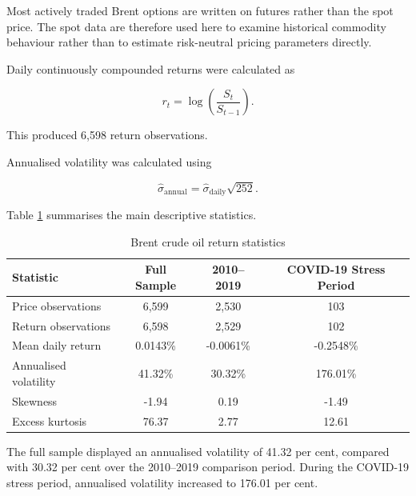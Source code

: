 Most actively traded Brent options are written on futures rather than the spot price. The spot data are therefore used here to examine historical commodity behaviour rather than to estimate risk-neutral pricing parameters directly.

Daily continuously compounded returns were calculated as

\begin{equation}
r_t
=
\log
\left(
\frac{S_t}{S_{t-1}}
\right).
\end{equation}

This produced 6,598 return observations.

Annualised volatility was calculated using

\begin{equation}
\widehat{\sigma}_{\mathrm{annual}}
=
\widehat{\sigma}_{\mathrm{daily}}
\sqrt{252}.
\end{equation}

Table \ref{tab:brent_stats} summarises the main descriptive statistics.

\begin{table}[htbp]
\centering
\caption{Brent crude oil return statistics}
\label{tab:brent_stats}
\begin{tabular}{lccc}
\toprule
Statistic
& Full Sample
& 2010--2019
& COVID-19 Stress Period \\
\midrule
Price observations
& 6,599
& 2,530
& 103 \\

    Return observations
    & 6,598
    & 2,529
    & 102 \\

    Mean daily return
    & 0.0143\%
    & -0.0061\%
    & -0.2548\% \\

    Annualised volatility
    & 41.32\%
    & 30.32\%
    & 176.01\% \\

    Skewness
    & -1.94
    & 0.19
    & -1.49 \\

    Excess kurtosis
    & 76.37
    & 2.77
    & 12.61 \\
    \bottomrule
\end{tabular}

\end{table}

The full sample displayed an annualised volatility of 41.32 per cent, compared with 30.32 per cent over the 2010--2019 comparison period. During the COVID-19 stress period, annualised volatility increased to 176.01 per cent.

